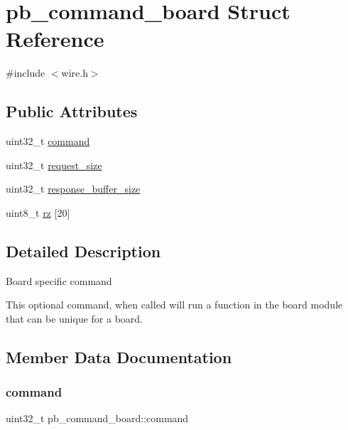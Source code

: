 \hypertarget{structpb__command__board}{}\section{pb\+\_\+command\+\_\+board Struct Reference}
\label{structpb__command__board}


{\ttfamily \#include $<$wire.\+h$>$}

\subsection*{Public Attributes}
\begin{DoxyCompactItemize}
\item 
uint32\+\_\+t \hyperlink{structpb__command__board_a0a82ab61f71bcf4b68319d01b90a78b7}{command}
\item 
uint32\+\_\+t \hyperlink{structpb__command__board_a748f573d48c798718123eee30d4c6708}{request\+\_\+size}
\item 
uint32\+\_\+t \hyperlink{structpb__command__board_a1257207ae1c927f6ad15b9d992847dba}{response\+\_\+buffer\+\_\+size}
\item 
uint8\+\_\+t \hyperlink{structpb__command__board_a1b4c5932c2b9ea9eb359a0a7cb59d174}{rz} \mbox{[}20\mbox{]}
\end{DoxyCompactItemize}


\subsection{Detailed Description}
Board specific command

This optional command, when called will run a function in the board module that can be unique for a board. 

\subsection{Member Data Documentation}
\mbox{\label{structpb__command__board_a0a82ab61f71bcf4b68319d01b90a78b7}} 
\subsubsection{\texorpdfstring{command}{command}}
{\footnotesize\ttfamily uint32\+\_\+t pb\+\_\+command\+\_\+board\+::command}

